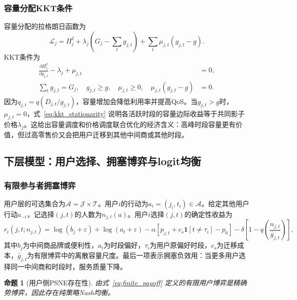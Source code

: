 \documentclass[UTF8,11pt]{ctexart}
\newtheorem{proposition}{命题}
\newcommand{\qos}{q}
\newcommand{\T}{\mathcal{T}}
\newcommand{\J}{\mathcal{J}}
\newcommand{\A}{\mathcal{A}}
\newcommand{\D}{D}
\begin{document}
\subsubsection{容量分配KKT条件}

容量分配的拉格朗日函数为
\begin{equation}
  \mathcal{L}_j=\Pi^I_j+\lambda_j\left(G_j-\sum_t g_{j,t}\right)
  +\sum_t \mu_{j,t}(g_{j,t}-\underline g).
  \label{eq:broker_lagrangian}
\end{equation}
KKT条件为
\begin{align}
  \frac{\partial\Pi^I_j}{\partial g_{j,t}}-\lambda_j+\mu_{j,t}&=0,
  \label{eq:kkt_stationarity}\\
  \sum_t g_{j,t}=G_j,\quad g_{j,t}\ge \underline g,\quad \mu_{j,t}\ge 0,\quad
  \mu_{j,t}(g_{j,t}-\underline g)&=0. \label{eq:kkt_complementarity}
\end{align}
因为$q_{j,t}=\qos(\D_{j,t}/g_{j,t})$，容量增加会降低利用率并提高QoS。当$g_{j,t}>\underline g$时，$\mu_{j,t}=0$，式~\eqref{eq:kkt_stationarity} 说明各活跃时段的容量边际收益等于共同影子价格$\lambda_j$。这给出容量调度和价格调度联合优化的经济含义：高峰时段容量更有价值，但过高零售价又会把用户迁移到其他中间商或其他时段。

\subsection{下层模型：用户选择、拥塞博弈与logit均衡}
\label{sec:lower_user}

\subsubsection{有限参与者拥塞博弈}

用户层的可选集合为$\A=\J\times\T$。用户$i$的行动为$a_i=(j_i,t_i)\in\A$。给定其他用户行动$a_{-i}$，记选择$(j,t)$的人数为$n_{j,t}(a)$。用户$i$选择$(j,t)$的确定性收益为
\begin{equation}
  r_i(j,t;n_{j,t}) =
  \log(b_j+\varepsilon)+\log(a_t+\varepsilon)
  -\alpha\left[p_{j,t}+c_s\mathbf{1}[t\ne \tau_i]-p_0\right]
  -\delta\left[1-\qos\!\left(\frac{n_{j,t}}{\bar g_{j,t}}\right)\right],
  \label{eq:finite_payoff}
\end{equation}
其中$b_j$为中间商品牌或便利性，$a_t$为时段偏好，$\tau_i$为用户原偏好时段，$c_s$为迁移成本，$\bar g_{j,t}$为有限博弈中的离散容量尺度。最后一项表示拥塞负效用：当更多用户选择同一中间商和时段时，服务质量下降。

\begin{proposition}[用户侧PSNE存在性]
\label{prop:psne}
由式~\eqref{eq:finite_payoff} 定义的有限用户博弈是精确势博弈，因此存在纯策略Nash均衡。
\end{proposition}
\end{document}
